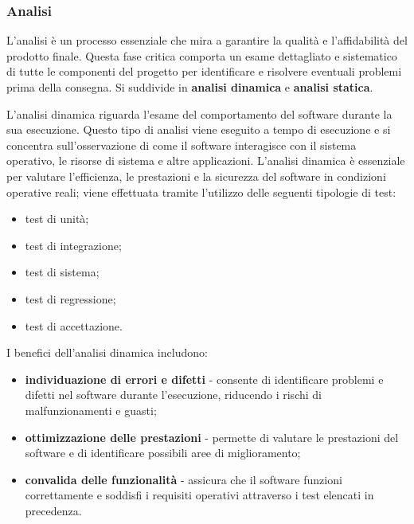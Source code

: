 \subsubsection{Analisi}
L'analisi è un processo essenziale che mira a garantire la qualità e l'affidabilità del prodotto finale. Questa fase critica comporta un esame dettagliato e sistematico di tutte le componenti del progetto per identificare e risolvere eventuali problemi prima della consegna. Si suddivide in \textbf{analisi dinamica} e \textbf{analisi statica}.

L'analisi dinamica riguarda l'esame del comportamento del software durante la sua esecuzione. Questo tipo di analisi viene eseguito a tempo di esecuzione e si concentra sull'osservazione di come il software interagisce con il sistema operativo, le risorse di sistema e altre applicazioni. L'analisi dinamica è essenziale per valutare l'efficienza, le prestazioni e la sicurezza del software in condizioni operative reali; viene effettuata tramite l'utilizzo delle seguenti tipologie di test:
\begin{itemize}
	\item test di unità;
	\item test di integrazione;
	\item test di sistema;
	\item test di regressione;
	\item test di accettazione.
\end{itemize}
I benefici dell'analisi dinamica includono:
\begin{itemize}
	\item \textbf{individuazione di errori e difetti} - consente di identificare problemi e difetti nel software durante l'esecuzione, riducendo i rischi di malfunzionamenti e guasti;
	\item \textbf{ottimizzazione delle prestazioni} - permette di valutare le prestazioni del software e di identificare possibili aree di miglioramento;
	\item \textbf{convalida delle funzionalità} - assicura che il software funzioni correttamente e soddisfi i requisiti operativi attraverso i test elencati in precedenza.
\end{itemize}

